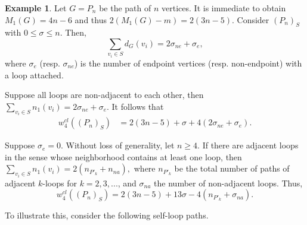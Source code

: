\documentclass[12pt,a4paper,reqno]{amsart}
\numberwithin{equation}{section}
\theoremstyle{plain}
\theoremstyle{definition}
\newtheorem{example}[theorem]{Example}
\newcommand{\<}{\langle}
\renewcommand{\>}{\rangle}
\begin{document}
\begin{example}
\label{expPn}
Let $G=P_n$ be the path of $n$ vertices. It is immediate to obtain $M_1(G)=4n-6$ and thus $2(M_1(G)-m)=2(3n-5).$ Consider $(P_n)_S$ with $0\leq \sigma \leq n.$ Then,
\[
\sum_{v_i \in S} d_G(v_i)=2\sigma_{ne} + \sigma_e,
\] 
where $\sigma_e$ (resp. $\sigma_{ne}$) is the number of endpoint vertices (resp. non-endpoint) with a loop attached.

Suppose all loops are non-adjacent to each other, then $\sum_{v_i\in S} n_1(v_i) = 2\sigma_{ne} + \sigma_e.$ It follows that
\begin{align*}
w_4^{cl}((P_n)_S) 
&= 2(3n-5)+\sigma + 4(2\sigma_{ne}+\sigma_e).
\end{align*}

Suppose $\sigma_e=0.$ Without loss of generality, let $n \geq 4.$ If there are adjacent loops in the sense whose neighborhood contains at least one loop, then 
$
\sum_{v_i \in S} n_1(v_i) = 2 (n_{P'_{k}} + n_{na}),
$ where $n_{P'_k}$ be the total number of paths of adjacent $k$-loops for $k=2,3,...$, and $\sigma_{na}$ the number of non-adjacent loops. Thus, %
\[
w_4^{cl}((P_n)_S) =2(3n-5) + 13\sigma - 4(n_{P'_{k}} + \sigma_{na}).
\] 

To illustrate this, consider the following self-loop paths. 
\begin{figure}[H]
 \begin{center}
\end{center}
\end{figure}
\end{example}
\end{document}
